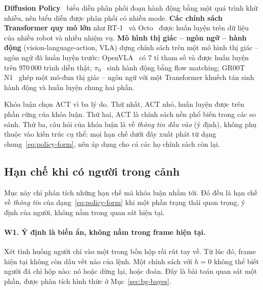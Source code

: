 \textbf{Diffusion Policy}~\cite{chi2023diffusion} biểu diễn phân phối đoạn hành động bằng một quá trình khử nhiễu, nên biểu diễn được phân phối có nhiều mode. \textbf{Các chính sách Transformer quy mô lớn} như RT-1~\cite{brohan2023rt1} và Octo~\cite{octo2024} được huấn luyện trên dữ liệu của nhiều robot và nhiều nhiệm vụ. \textbf{Mô hình thị giác -- ngôn ngữ -- hành động} (vision-language-action, VLA) dựng chính sách trên một mô hình thị giác -- ngôn ngữ đã huấn luyện trước: OpenVLA~\cite{kim2024openvla} có 7 tỉ tham số và được huấn luyện trên 970\,000 trình diễn thật; $\pi_0$~\cite{black2024pi0} sinh hành động bằng flow matching; GR00T N1~\cite{nvidia2025gr00t} ghép một mô-đun thị giác -- ngôn ngữ với một Transformer khuếch tán sinh hành động và huấn luyện chung hai phần.

Khóa luận chọn ACT vì ba lý do. Thứ nhất, ACT nhỏ, huấn luyện được trên phần cứng của khóa luận. Thứ hai, ACT là chính sách nền phổ biến trong các so sánh. Thứ ba, câu hỏi của khóa luận là về \emph{thông tin đầu vào} (ý định), không phụ thuộc vào kiến trúc cụ thể: mọi hạn chế dưới đây xuất phát từ dạng chung~\eqref{eq:policy-form}, nên áp dụng cho cả các họ chính sách còn lại.

\subsection{Hạn chế khi có người trong cảnh}
\label{sec:bg-act-weak}

Mục này chỉ phân tích những hạn chế mà khóa luận nhắm tới. Đó đều là hạn chế về \emph{thông tin} của dạng~\eqref{eq:policy-form} khi một phần trạng thái quan trọng, ý định của người, không nằm trong quan sát hiện tại.

\paragraph{W1. Ý định là biến ẩn, không nằm trong frame hiện tại.} Xét tình huống người chỉ vào một trong bốn hộp rồi rút tay về. Từ lúc đó, frame hiện tại không còn dấu vết nào của lệnh. Một chính sách với $h=0$ không thể biết người đã chỉ hộp nào: nó hoặc dừng lại, hoặc đoán. Đây là bài toán quan sát một phần, được phân tích hình thức ở Mục~\ref{sec:bg-bayes}.

